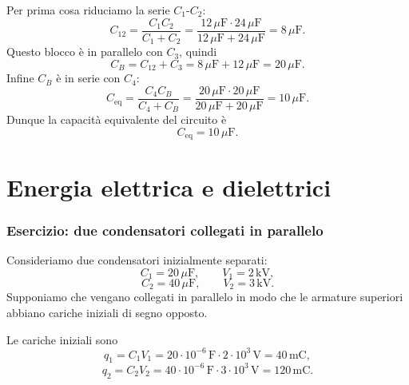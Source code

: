\documentclass[a4paper]{article}
\begin{document}
\begin{snippetsolution}{}
    Per prima cosa riduciamo la serie \(C_1\)-\(C_2\):
    \[
        C_{12}=\frac{C_1C_2}{C_1+C_2}
        =\frac{12\,\mu\mathrm{F}\cdot24\,\mu\mathrm{F}}{12\,\mu\mathrm{F}+24\,\mu\mathrm{F}}
        =8\,\mu\mathrm{F}.
    \]
    Questo blocco è in parallelo con \(C_3\), quindi
    \[
        C_B=C_{12}+C_3=8\,\mu\mathrm{F}+12\,\mu\mathrm{F}=20\,\mu\mathrm{F}.
    \]
    Infine \(C_B\) è in serie con \(C_4\):
    \[
        C_{\mathrm{eq}}=\frac{C_4C_B}{C_4+C_B}
        =\frac{20\,\mu\mathrm{F}\cdot20\,\mu\mathrm{F}}{20\,\mu\mathrm{F}+20\,\mu\mathrm{F}}
        =10\,\mu\mathrm{F}.
    \]
    Dunque la capacità equivalente del circuito è
    \[
        C_{\mathrm{eq}}=10\,\mu\mathrm{F}.
    \]
\end{snippetsolution}

\pagebreak
\part{Energia elettrica e dielettrici}

\section{Esercizio: due condensatori collegati in parallelo}

Consideriamo due condensatori inizialmente separati:
\[
    C_1=20\,\mu\mathrm{F},
    \qquad
    V_1=2\,\mathrm{kV},
\]
\[
    C_2=40\,\mu\mathrm{F},
    \qquad
    V_2=3\,\mathrm{kV}.
\]
Supponiamo che vengano collegati in parallelo in modo che le armature superiori abbiano cariche iniziali di segno opposto.

\begin{center}
\end{center}

Le cariche iniziali sono
\[
    q_1=C_1V_1=20\cdot 10^{-6}\,\mathrm{F}\cdot2\cdot10^3\,\mathrm{V}=40\,\mathrm{mC},
\]
\[
    q_2=C_2V_2=40\cdot 10^{-6}\,\mathrm{F}\cdot3\cdot10^3\,\mathrm{V}=120\,\mathrm{mC}.
\]
\end{document}
